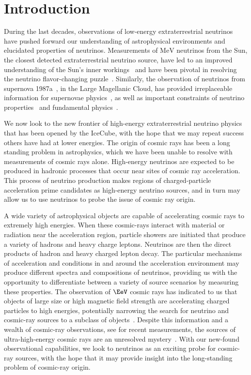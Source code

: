 \chapter{Introduction}

During the last decades, observations of low-energy extraterrestrial neutrinos have pushed forward our understanding of astrophysical environments and elucidated properties of neutrinos.
Measurements of $\si\MeV$ neutrinos from the Sun, the closest detected extraterrestrial neutrino source, have led to an improved understanding of the Sun's inner workings~\cite{Raffelt:1999tx,Bahcall:2004pz} and have been pivotal in resolving the neutrino flavor-changing puzzle~\cite{McDonald:2016ixn}.
Similarly, the observation of neutrinos from supernova 1987a~\cite{Hirata:1987hu,Bratton:1988ww}, in the Large Magellanic Cloud, has provided irreplaceable information for supernovae physics~\cite{Bethe:1990mw}, as well as important constraints of neutrino properties~\cite{Arnett:1987iz,Goldman:1987fg,Manohar:1987ec,Lattimer:1988mf} and fundamental physics~\cite{Raffelt:1987yt,Turner:1987by}.

We now look to the new frontier of high-energy extraterrestrial neutrino physics that has been opened by the IceCube, with the hope that we may repeat success others have had at lower energies.
The origin of cosmic rays has been a long standing problem in astrophysics, which we have been unable to resolve with measurements of cosmic rays alone.
High-energy neutrinos are expected to be produced in hadronic processes that occur near sites of cosmic ray acceleration.
This process of neutrino production makes regions of charged-particle acceleration prime candidates as high-energy neutrino sources, and in turn may allow us to use neutrinos to probe the issue of cosmic ray origin.

A wide variety of astrophysical objects are capable of accelerating cosmic rays to extremely high energies.
When these cosmic-rays interact with material or radiation near the acceleration region, particle showers are initiated that produce a variety of hadrons and heavy charge leptons.
Neutrinos are then the direct products of hadron and heavy charged lepton decay.
The particular mechanisms of acceleration and conditions in and around the acceleration environment may produce different spectra and compositions of neutrinos, providing us with the opportunity to differentiate between a variety of source scenarios by measuring these properties.
The observation of $\si\EeV$ cosmic rays has indicated to us that objects of large size or high magnetic field strength are accelerating charged particles to high energies, potentially narrowing the search for neutrino and cosmic-ray sources to a subclass of objects~\cite{gaisser1990cosmic,LetessierSelvon:2011dy}.
Despite this information and a wealth of cosmic-ray observations, see  for recent measurements, the sources of ultra-high-energy cosmic rays are an unresolved mystery~\cite{Kotera:2011cp}.
With our new-found observational capabilities, we look to neutrinos as an exciting probe for cosmic-ray sources, with the hope that it may provide insight into the long-standing problem of cosmic-ray origin.

